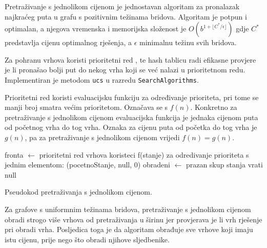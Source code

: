 Pretraživanje s jednolikom cijenom  je jednostavan algoritam za pronalazak najkraćeg puta u grafu s pozitivnim težinama bridova.
Algoritam je potpun i optimalan, a njegova vremenska i memorijska složenost je \( O \left (b^{1 + \lfloor {C^*}/{\epsilon} \rfloor} \right ) \) gdje \( C^* \) predstavlja cijenu optimalnog rješenja, a \( \epsilon \) minimalnu težinu svih bridova. \cite{russelNorvig2003:aima}

Za pohranu vrhova koristi prioritetni red , te hash tablicu radi efikasne provjere je li pronašao bolji put do nekog vrha koji se već nalazi u prioritetnom redu.
Implementiran je metodom \texttt{ucs} u razredu \texttt{SearchAlgorithms}.

Prioritetni red koristi evaluacijsku funkciju  za određivanje prioriteta, pri tome se manji broj smatra većim prioritetom. 
Označava se s \( f(n) \).
Konkretno za pretraživanje s jednolikom cijenom evaluacijska funkcija je jednaka cijenom puta od početnog vrha do tog vrha. 
Oznaka za cijenu puta od početka do tog vrha je \( g(n) \), pa za pretraživanje s jednolikom cijenom vrijedi \( f(n) = g(n) \).

\begin{algorithm}[h]
	fronta $\gets$ prioritetni red vrhova koristeci f(stanje) za odredivanje prioriteta s jednim elementom: (pocetnoStanje, null, 0)\;
	obradeni $\gets$ prazan skup stanja\;
	vrati null\;
	\caption{Pseudokod pretraživanja s jednolikom cijenom.}
\end{algorithm}

Za grafove s uniformnim težinama bridova, pretraživanje s jednolikom cijenom obradi strogo više vrhova od pretraživanja u širinu jer provjerava je li vrh rješenje pri obradi vrha.
Posljedica toga je da algoritam obrađuje sve vrhove koji imaju istu cijenu, prije nego što obradi njihove sljedbenike.

